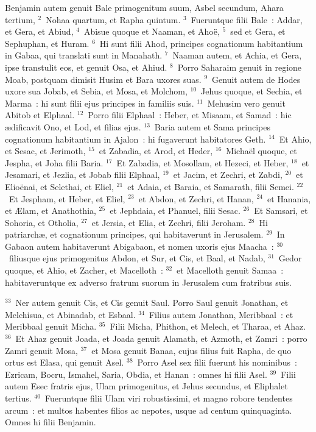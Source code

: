 \bchapter
\lettrine[lines=3,image=true,loversize=0.05,lraise=-0.03]{B}{}enjamin autem genuit Bale primogenitum suum, Asbel secundum, Ahara tertium,
${}^{2}$~Nohaa quartum, et Rapha quintum.
${}^{3}$~Fueruntque filii Bale~: Addar, et Gera, et Abiud,
${}^{4}$~Abisue quoque et Naaman, et Aho\"e,
${}^{5}$~sed et Gera, et Sephuphan, et Huram.
${}^{6}$~Hi sunt filii Ahod, principes cognationum habitantium in Gabaa, qui translati sunt in Manahath.
${}^{7}$~Naaman autem, et Achia, et Gera, ipse transtulit eos, et genuit Osa, et Ahiud.
${}^{8}$~Porro Saharaim genuit in regione Moab, postquam dimisit Husim et Bara uxores suas.
${}^{9}$~Genuit autem de Hodes uxore sua Jobab, et Sebia, et Mosa, et Molchom,
${}^{10}$~Jehus quoque, et Sechia, et Marma~: hi sunt filii ejus principes in familiis suis.
${}^{11}$~Mehusim vero genuit Abitob et Elphaal.
${}^{12}$~Porro filii Elphaal~: Heber, et Misaam, et Samad~: hic \ae dificavit Ono, et Lod, et filias ejus.
${}^{13}$~Baria autem et Sama principes cognationum habitantium in Ajalon~: hi fugaverunt habitatores Geth.
${}^{14}$~Et Ahio, et Sesac, et Jerimoth,
${}^{15}$~et Zabadia, et Arod, et Heder,
${}^{16}$~Micha\"el quoque, et Jespha, et Joha filii Baria.
${}^{17}$~Et Zabadia, et Mosollam, et Hezeci, et Heber,
${}^{18}$~et Jesamari, et Jezlia, et Jobab filii Elphaal,
${}^{19}$~et Jacim, et Zechri, et Zabdi,
${}^{20}$~et Elio\"enai, et Selethai, et Eliel,
${}^{21}$~et Adaia, et Baraia, et Samarath, filii Semei.
${}^{22}$~Et Jespham, et Heber, et Eliel,
${}^{23}$~et Abdon, et Zechri, et Hanan,
${}^{24}$~et Hanania, et \AE lam, et Anathothia,
${}^{25}$~et Jephdaia, et Phanuel, filii Sesac.
${}^{26}$~Et Samsari, et Sohoria, et Otholia,
${}^{27}$~et Jersia, et Elia, et Zechri, filii Jeroham.
${}^{28}$~Hi patriarch\ae , et cognationum principes, qui habitaverunt in Jerusalem.
${}^{29}$~In Gabaon autem habitaverunt Abigabaon, et nomen uxoris ejus Maacha~:
${}^{30}$~filiusque ejus primogenitus Abdon, et Sur, et Cis, et Baal, et Nadab,
${}^{31}$~Gedor quoque, et Ahio, et Zacher, et Macelloth~:
${}^{32}$~et Macelloth genuit Samaa~: habitaveruntque ex adverso fratrum suorum in Jerusalem cum fratribus suis.


${}^{33}$~Ner autem genuit Cis, et Cis genuit Saul. Porro Saul genuit Jonathan, et Melchisua, et Abinadab, et Esbaal.
${}^{34}$~Filius autem Jonathan, Meribbaal~: et Meribbaal genuit Micha.
${}^{35}$~Filii Micha, Phithon, et Melech, et Tharaa, et Ahaz.
${}^{36}$~Et Ahaz genuit Joada, et Joada genuit Alamath, et Azmoth, et Zamri~: porro Zamri genuit Mosa,
${}^{37}$~et Mosa genuit Banaa, cujus filius fuit Rapha, de quo ortus est Elasa, qui genuit Asel.
${}^{38}$~Porro Asel sex filii fuerunt his nominibus~: Ezricam, Bocru, Ismahel, Saria, Obdia, et Hanan~: omnes hi filii Asel.
${}^{39}$~Filii autem Esec fratris ejus, Ulam primogenitus, et Jehus secundus, et Eliphalet tertius.
${}^{40}$~Fueruntque filii Ulam viri robustissimi, et magno robore tendentes arcum~: et multos habentes filios ac nepotes, usque ad centum quinquaginta. Omnes hi filii Benjamin.

